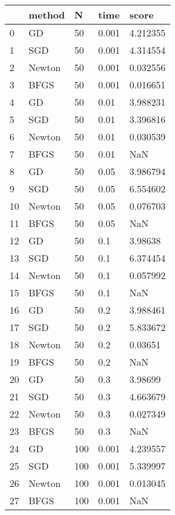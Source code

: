 \begin{tabular}{lllll}
\toprule
{} &  method &        N &   time &     score \\
\midrule
0   &      GD &       50 &  0.001 &  4.212355 \\
1   &     SGD &       50 &  0.001 &  4.314554 \\
2   &  Newton &       50 &  0.001 &  0.032556 \\
3   &    BFGS &       50 &  0.001 &  0.016651 \\
4   &      GD &       50 &   0.01 &  3.988231 \\
5   &     SGD &       50 &   0.01 &  3.396816 \\
6   &  Newton &       50 &   0.01 &  0.030539 \\
7   &    BFGS &       50 &   0.01 &       NaN \\
8   &      GD &       50 &   0.05 &  3.986794 \\
9   &     SGD &       50 &   0.05 &  6.554602 \\
10  &  Newton &       50 &   0.05 &  0.076703 \\
11  &    BFGS &       50 &   0.05 &       NaN \\
12  &      GD &       50 &    0.1 &   3.98638 \\
13  &     SGD &       50 &    0.1 &  6.374454 \\
14  &  Newton &       50 &    0.1 &  0.057992 \\
15  &    BFGS &       50 &    0.1 &       NaN \\
16  &      GD &       50 &    0.2 &  3.988461 \\
17  &     SGD &       50 &    0.2 &  5.833672 \\
18  &  Newton &       50 &    0.2 &   0.03651 \\
19  &    BFGS &       50 &    0.2 &       NaN \\
20  &      GD &       50 &    0.3 &   3.98699 \\
21  &     SGD &       50 &    0.3 &  4.663679 \\
22  &  Newton &       50 &    0.3 &  0.027349 \\
23  &    BFGS &       50 &    0.3 &       NaN \\
24  &      GD &      100 &  0.001 &  4.239557 \\
25  &     SGD &      100 &  0.001 &  5.339997 \\
26  &  Newton &      100 &  0.001 &  0.013045 \\
27  &    BFGS &      100 &  0.001 &       NaN \\

\end{tabular}
